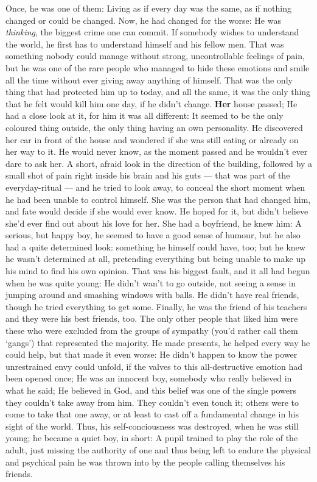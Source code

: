 Once, he was one of them: Living as if every day was the same, as if nothing changed or could be changed. Now, he had changed for the worse: He was \emph{thinking}, the biggest crime one can commit. If somebody wishes to understand the world, he first has to understand himself and his fellow men. That was something nobody could manage without strong, uncontrollable feelings of pain, but he was one of the rare people who managed to hide these emotions and smile all the time without ever giving away anything of himself. That was the only thing that had protected him up to today, and all the same, it was the only thing that he felt would kill him one day, if he didn't change. \textbf{Her} house passed; He had a close look at it, for him it was all different: It seemed to be the only coloured thing outside, the only thing having an own personality. He discovered her car in front of the house and wondered if she was still eating or already on her way to it. He would never know, as the moment passed and he wouldn't ever dare to ask her. A short, afraid look in the direction of the building, followed by a small shot of pain right inside his brain and his guts --- that was part of the everyday-ritual --- and he tried to look away, to conceal the short moment when he had been unable to control himself. She was the person that had changed him, and fate would decide if she would ever know. He hoped for it, but didn't believe she'd ever find out about his love for her. She had a boyfriend, he knew him: A serious, but happy boy, he seemed to have a good sense of humour, but he also had a quite determined look: something he himself could have, too; but he knew he wasn't determined at all, pretending everything but being unable to make up his mind to find his own opinion. That was his biggest fault, and it all had begun when he was quite young: He didn't wan't to go outside, not seeing a sense in jumping around and smashing windows with balls. He didn't have real friends, though he tried everything to get some. Finally, he was the friend of his teachers and they were his best friends, too. The only other people that liked him were these who were excluded from the groups of sympathy (you'd rather call them `gangs') that represented the majority. He made presents, he helped every way he could help, but that made it even worse: He didn't happen to know the power unrestrained envy could unfold, if the valves to this all-destructive emotion had been opened once; He was an innocent boy, somebody who really believed in what he said; He believed in God, and this belief was one of the single powers they couldn't take away from him. They couldn't even touch it; others were to come to take that one away, or at least to cast off a fundamental change in his sight of the world. Thus, his self-conciousness was destroyed, when he was still young; he became a quiet boy, in short: A pupil trained to play the role of the adult, just missing the authority of one and thus being left to endure the physical and psychical pain he was thrown into by the people calling themselves his friends. 
